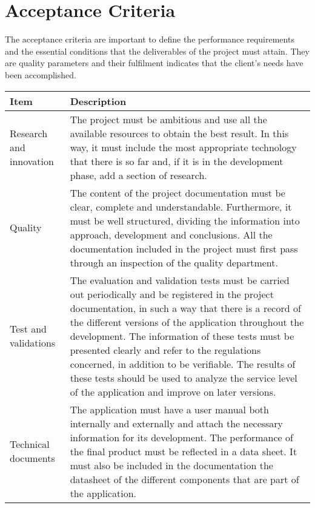 \section{Acceptance Criteria}

The acceptance criteria are important to define the performance requirements and the essential conditions that the deliverables of the project must attain. They are quality parameters and their fulfilment indicates that the client's needs have been accomplished.

\begin{longtable}[H]{lp{10.2cm}}
	
	\toprule[2pt]
	
	\textbf{Item} & \textbf{Description} \\ 
	
	\midrule[1.5pt] 
	\endhead

	
	Research and innovation & The project must be ambitious and use all the available resources to obtain the best result. In this way, it must include the most appropriate technology that there is so far and, if it is in the development phase, add a section of research. \vspace{0.2cm}
	\\ \midrule
	
	Quality & The content of the project documentation must be clear, complete and understandable. Furthermore, it must be well structured, dividing the information into approach, development and conclusions. 
	\newline
	All the documentation included in the project must first pass through an inspection of the quality department. \vspace{0.2cm}
	\\ \midrule
	
	Test and validations & The evaluation and validation tests must be carried out periodically and be registered in the project documentation, in such a way that there is a record of the different versions of the application throughout the development. 
	\newline
	The information of these tests must be presented clearly and refer to the regulations concerned, in addition to be verifiable. 
	\newline
	The results of these tests should be used to analyze the service level of the application and improve on later versions. \vspace{0.2cm}
	\\ \midrule
	
	Technical documents & The application must have a user manual both internally and externally and attach the necessary information for its development. 
	\newline
	The performance of the final product must be reflected in a data sheet. It must also be included in the documentation the datasheet of the different components that are part of the application. \vspace{0.2cm}
	\\ \midrule


\end{longtable}
